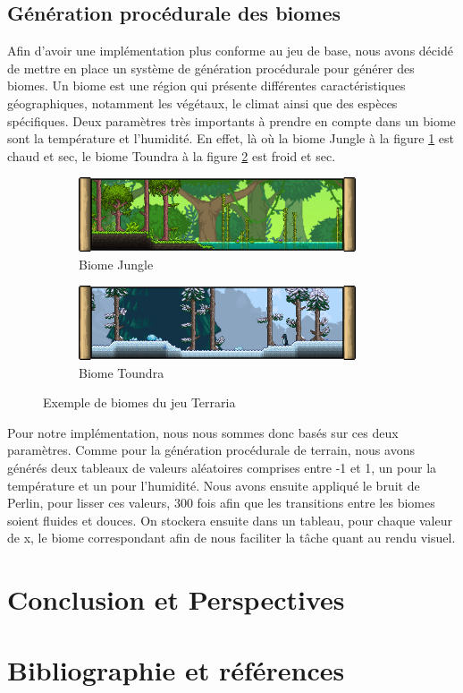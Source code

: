 \documentclass{article}
\begin{document}
\subsection{Génération procédurale des biomes}
Afin d'avoir une implémentation plus conforme au jeu de base, nous avons décidé de mettre en place un système de génération procédurale pour générer des biomes.
Un biome est une région qui présente différentes caractéristiques géographiques, notamment les végétaux, le climat ainsi que des espèces spécifiques. Deux paramètres très importants à prendre en compte dans un biome sont la température et l'humidité. En effet, là où la biome Jungle à la figure \ref{jungle} est chaud et sec, le biome Toundra à la figure \ref{toundra} est froid et sec.\par

\begin{figure}[!h]
  \centering
  \begin{subfigure}[b]{0.4\textwidth}
    \centering
    \includegraphics[width=0.9\textwidth]{assets/jungle.png}
    \caption{Biome Jungle}
    \label{jungle}
  \end{subfigure}
  \hspace{1cm}
  \begin{subfigure}[b]{0.4\textwidth}
    \centering
    \includegraphics[width=0.9\textwidth]{assets/toundra.png}
    \caption{Biome Toundra}
    \label{toundra}
  \end{subfigure}
  \caption{Exemple de biomes du jeu Terraria}
  \label{biomes}
\end{figure}
Pour notre implémentation, nous nous sommes donc basés sur ces deux paramètres. Comme pour la génération procédurale de terrain, nous avons générés deux tableaux de valeurs aléatoires comprises entre -1 et 1, un pour la température et un pour l'humidité. Nous avons ensuite appliqué le bruit de Perlin, pour lisser ces valeurs, 300 fois afin que les transitions entre les biomes soient fluides et douces. On stockera ensuite dans un tableau, pour chaque valeur de x, le biome correspondant afin de nous faciliter la tâche quant au rendu visuel.
\section{Conclusion et Perspectives}

\section{Bibliographie et références}


\end{document}
